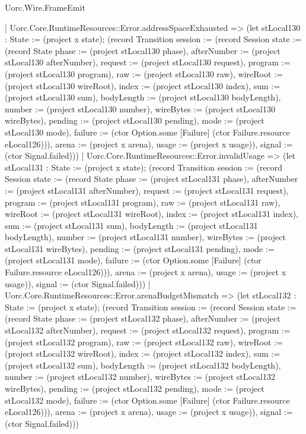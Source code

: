 \begin{lexlean}{Uorc.Wire.FrameEmit}
\begin{semanticmodule}
{      | Uorc.Core.RuntimeResources::Error.addressSpaceExhausted => (let stLocal130 : State := (project x state); (record Transition {session := (record Session {state := (record State {phase := (project stLocal130 phase), afterNumber := (project stLocal130 afterNumber), request := (project stLocal130 request), program := (project stLocal130 program), raw := (project stLocal130 raw), wireRoot := (project stLocal130 wireRoot), index := (project stLocal130 index), sum := (project stLocal130 sum), bodyLength := (project stLocal130 bodyLength), number := (project stLocal130 number), wireBytes := (project stLocal130 wireBytes), pending := (project stLocal130 pending), mode := (project stLocal130 mode), failure := (ctor Option.some [Failure] (ctor Failure.resource eLocal126))}), arena := (project x arena), usage := (project x usage)}), signal := (ctor Signal.failed)}))
      | Uorc.Core.RuntimeResources::Error.invalidUsage => (let stLocal131 : State := (project x state); (record Transition {session := (record Session {state := (record State {phase := (project stLocal131 phase), afterNumber := (project stLocal131 afterNumber), request := (project stLocal131 request), program := (project stLocal131 program), raw := (project stLocal131 raw), wireRoot := (project stLocal131 wireRoot), index := (project stLocal131 index), sum := (project stLocal131 sum), bodyLength := (project stLocal131 bodyLength), number := (project stLocal131 number), wireBytes := (project stLocal131 wireBytes), pending := (project stLocal131 pending), mode := (project stLocal131 mode), failure := (ctor Option.some [Failure] (ctor Failure.resource eLocal126))}), arena := (project x arena), usage := (project x usage)}), signal := (ctor Signal.failed)}))
      | Uorc.Core.RuntimeResources::Error.arenaBudgetMismatch => (let stLocal132 : State := (project x state); (record Transition {session := (record Session {state := (record State {phase := (project stLocal132 phase), afterNumber := (project stLocal132 afterNumber), request := (project stLocal132 request), program := (project stLocal132 program), raw := (project stLocal132 raw), wireRoot := (project stLocal132 wireRoot), index := (project stLocal132 index), sum := (project stLocal132 sum), bodyLength := (project stLocal132 bodyLength), number := (project stLocal132 number), wireBytes := (project stLocal132 wireBytes), pending := (project stLocal132 pending), mode := (project stLocal132 mode), failure := (ctor Option.some [Failure] (ctor Failure.resource eLocal126))}), arena := (project x arena), usage := (project x usage)}), signal := (ctor Signal.failed)}))
}
\end{semanticmodule}
\end{lexlean}

